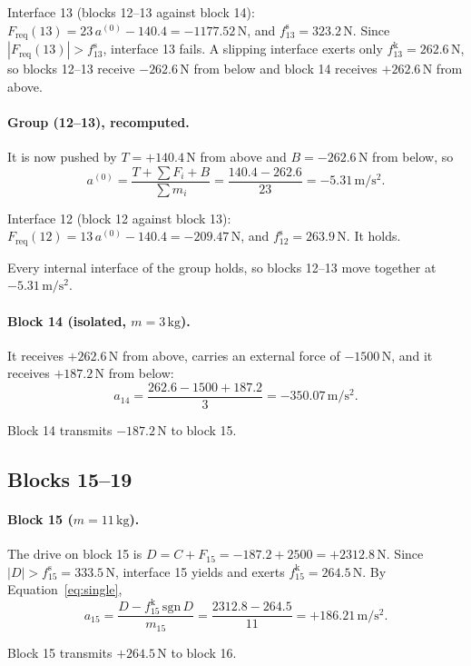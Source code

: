 \documentclass[11pt,a4paper]{article}
\begin{document}
Interface 13 (blocks 12--13 against block 14): $F_{\mathrm{req}}(13)=23\,a^{(0)} - 140.4=-1177.52\,\mathrm{N}$, and $f^{\mathrm s}_{13}=323.2\,\mathrm{N}$. Since $|F_{\mathrm{req}}(13)|>f^{\mathrm s}_{13}$, interface 13 fails. A slipping interface exerts only $f^{\mathrm k}_{13}=262.6\,\mathrm{N}$, so blocks 12--13 receive $-262.6\,\mathrm{N}$ from below and block 14 receives $+262.6\,\mathrm{N}$ from above.

\paragraph{Group (12--13), recomputed.} It is now pushed by $T=+140.4\,\mathrm{N}$ from above and $B=-262.6\,\mathrm{N}$ from below, so\[a^{(0)}=\dfrac{T+\sum F_i+B}{\sum m_i}=\dfrac{140.4 - 262.6}{23}=-5.31\,\mathrm{m/s^2}.\]

Interface 12 (block 12 against block 13): $F_{\mathrm{req}}(12)=13\,a^{(0)} - 140.4=-209.47\,\mathrm{N}$, and $f^{\mathrm s}_{12}=263.9\,\mathrm{N}$. It holds.

Every internal interface of the group holds, so blocks 12--13 move together at $-5.31\,\mathrm{m/s^2}$.

\paragraph{Block 14 (isolated, $m=3\,\mathrm{kg}$).} It receives $+262.6\,\mathrm{N}$ from above, carries an external force of $-1500\,\mathrm{N}$, and it receives $+187.2\,\mathrm{N}$ from below:\[a_{14}=\dfrac{262.6 - 1500 + 187.2}{3}=-350.07\,\mathrm{m/s^2}.\]

Block 14 transmits $-187.2\,\mathrm{N}$ to block 15.

\subsection{Blocks 15--19}
\paragraph{Block 15 ($m=11\,\mathrm{kg}$).} The drive on block 15 is $D=C+F_{15}=-187.2 + 2500=+2312.8\,\mathrm{N}$. Since $|D|>f^{\mathrm s}_{15}=333.5\,\mathrm{N}$, interface 15 yields and exerts $f^{\mathrm k}_{15}=264.5\,\mathrm{N}$. By Equation~\eqref{eq:single},\[a_{15}=\dfrac{D-f^{\mathrm k}_{15}\,\mathrm{sgn}\,D}{m_{15}}=\dfrac{2312.8 - 264.5}{11}=+186.21\,\mathrm{m/s^2}.\]

Block 15 transmits $+264.5\,\mathrm{N}$ to block 16.
\end{document}
